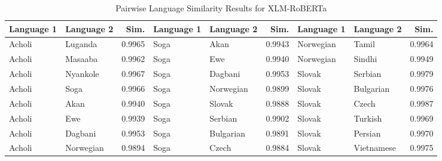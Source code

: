 \documentclass[11pt]{article} %
\begin{document}
    \begin{table}
        [p]
        \centering
        \caption{Pairwise Language Similarity Results for XLM-RoBERTa}
        \label{tab:xlmr-sim} \tiny
        \setlength{\tabcolsep}{3.2pt}
        \renewcommand{\arraystretch}{0.9}
        \begin{tabular}{llr@{\hspace{12pt}}llr@{\hspace{12pt}}llr}
            \toprule \textbf{Language 1} & \textbf{Language 2} & \textbf{Sim.} & \textbf{Language 1} & \textbf{Language 2} & \textbf{Sim.} & \textbf{Language 1} & \textbf{Language 2} & \textbf{Sim.} \\
            \midrule Acholi              & Luganda             & 0.9965        & Soga                & Akan                & 0.9943        & Norwegian           & Tamil               & 0.9964        \\
            Acholi                       & Masaaba             & 0.9962        & Soga                & Ewe                 & 0.9940        & Norwegian           & Sindhi              & 0.9949        \\
            Acholi                       & Nyankole            & 0.9967        & Soga                & Dagbani             & 0.9953        & Slovak              & Serbian             & 0.9979        \\
            Acholi                       & Soga                & 0.9966        & Soga                & Norwegian           & 0.9899        & Slovak              & Bulgarian           & 0.9976        \\
            Acholi                       & Akan                & 0.9940        & Soga                & Slovak              & 0.9888        & Slovak              & Czech               & 0.9987        \\
            Acholi                       & Ewe                 & 0.9939        & Soga                & Serbian             & 0.9902        & Slovak              & Turkish             & 0.9969        \\
            Acholi                       & Dagbani             & 0.9953        & Soga                & Bulgarian           & 0.9891        & Slovak              & Persian             & 0.9970        \\
            Acholi                       & Norwegian           & 0.9894        & Soga                & Czech               & 0.9884        & Slovak              & Vietnamese          & 0.9975        \\

\end{tabular}
\end{table}
\end{document}
